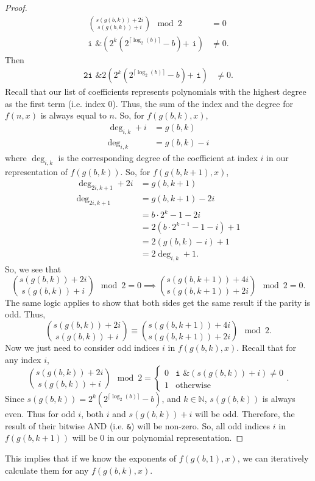 \documentclass{article}
\newcommand{\N}{\mathbb{N}}
\begin{document}
\begin{proof}
\begin{align*}
			\binom{s(g(b,k)) + 2i}{s(g(b,k)) + i} \mod 2 &= 0 \\
			\texttt{i \& }\left(2^{k}\left(2^{\lceil\log_2{(b)}\rceil} - b\right)\texttt{+ i}\right) &\neq 0.
		\end{align*}
		Then
		\begin{align*}
			\texttt{2i \& }2\left(2^{k}\left(2^{\lceil\log_2{(b)}\rceil} - b\right)\texttt{+ i}\right) &\neq 0.
		\end{align*}
		Recall that our list of coefficients represents polynomials with the highest degree as the first term (i.e. index 0).
		Thus, the sum of the index and the degree for $f(n,x)$ is always equal to $n$.
		So, for $f(g(b,k),x)$,
		\begin{align*}
			\deg_{i,k} + i &= g(b,k) \\
			\deg_{i,k} &= g(b,k) - i
		\end{align*}
		where $\deg_{i,k}$ is the corresponding degree of the coefficient at index $i$ in our representation of $f(g(b,k))$.
		So, for $f(g(b,k+1),x)$,
		\begin{align*}
			\deg_{2i,k+1} + 2i &= g(b,k+1) \\
			\deg_{2i,k+1} &= g(b,k+1) - 2i \\
			&= b\cdot2^{k} - 1 - 2i \\
			&= 2\left(b\cdot2^{k-1} - 1 - i\right) + 1 \\
			&= 2\left(g(b,k) - i\right) + 1 \\
			&= 2\deg_{i,k} + 1.
		\end{align*}
		So, we see that
		\begin{equation*}
			\binom{s(g(b,k)) + 2i}{s(g(b,k)) + i} \mod 2 = 0 \implies \binom{s(g(b,k+1)) + 4i}{s(g(b,k+1)) + 2i} \mod 2 = 0.
		\end{equation*}
		The same logic applies to show that both sides get the same result if the parity is odd. Thus,
		\begin{equation*}
			\binom{s(g(b,k)) + 2i}{s(g(b,k)) + i} \equiv \binom{s(g(b,k+1)) + 4i}{s(g(b,k+1)) + 2i} \mod 2.
		\end{equation*}
		Now we just need to consider odd indices $i$ in $f(g(b,k),x)$.
		Recall that for any index $i$,
		\begin{equation*}
			\binom{s(g(b,k)) + 2i}{s(g(b,k)) + i} \mod 2 =\begin{cases}
				0 & \texttt{i \& }\left(s(g(b,k)) + i\right) \neq 0 \\
				1 & \text{otherwise}
			\end{cases}.
		\end{equation*}
		Since $s(g(b,k)) = 2^k\left(2^{\lceil \log_2{(b)} \rceil} - b\right)$, and $k \in \N$,
		$s(g(b,k))$ is always even.
		Thus for odd $i$, both $i$ and $s(g(b,k)) + i$ will be odd.
		Therefore, the result of their bitwise AND (i.e. \texttt{\&}) will be non-zero.
		So, all odd indices $i$ in $f(g(b,k+1))$ will be 0 in our polynomial representation.
	\end{proof}
	This implies that if we know the exponents of $f(g(b,1),x)$, we can iteratively calculate them for any $f(g(b,k),x)$.
	
\end{document}
